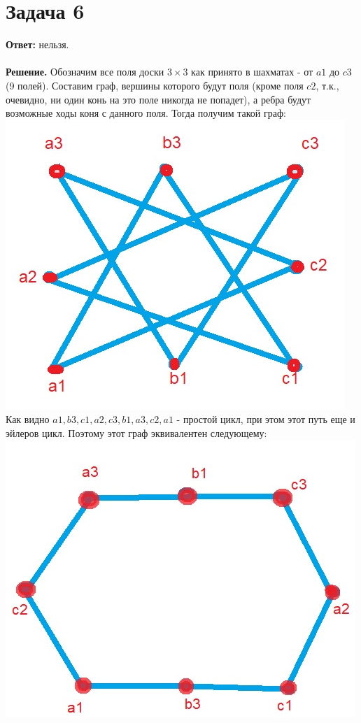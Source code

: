 \documentclass{article}
\begin{document}
\section*{Задача 6}
{\bf Ответ:} нельзя.
\\
\\
{\bf Решение.} Обозначим все поля доски $3\times3$ как принято в шахматах - от $a1$ до $c3$ (9 полей). Составим граф, вершины которого будут поля (кроме поля $c2$, т.к., очевидно, ни один конь на это поле никогда не попадет), а ребра будут возможные ходы коня с данного поля. Тогда получим такой граф:
\\
{\includegraphics[scale=0.3]{img/img4.jpg}}
\\
Как видно $a1,b3,c1,a2,c3,b1,a3,c2, a1$ - простой цикл, при этом этот путь еще и эйлеров цикл. Поэтому этот граф эквивалентен следующему:
\\
{\includegraphics[scale=0.3]{img/img5.jpg}}
\end{document}
